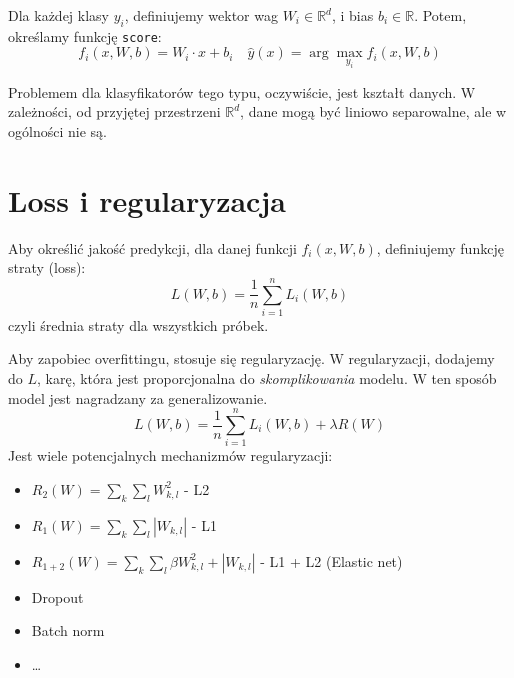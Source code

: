 \documentclass{../notatki}
\begin{document}
Dla każdej klasy $y_i$, definiujemy wektor wag $W_i \in
\mathbb{R}^d$, i bias $b_i \in \mathbb{R}$. Potem, określamy funkcję
\texttt{score}:
$$
f_i(x, W, b) = W_i \cdot x + b_i \quad \hat{y}(x) = \arg\max_{y_i} f_i(x, W, b)
$$

Problemem dla klasyfikatorów tego typu, oczywiście, jest kształt
danych. W zależności, od przyjętej przestrzeni $\mathbb{R}^d$, dane
mogą być liniowo separowalne, ale w ogólności nie są.

\section{Loss i regularyzacja}

Aby określić jakość predykcji, dla danej funkcji $f_i(x, W, b)$,
definiujemy funkcję straty (loss):
$$
L(W, b) = \frac{1}{n} \sum_{i=1}^n L_i(W, b)
$$
czyli średnia straty dla wszystkich próbek.

Aby zapobiec overfittingu, stosuje się regularyzację. W regularyzacji, dodajemy
do $L$, karę, która jest proporcjonalna do \textit{skomplikowania} modelu. W
ten sposób model jest nagradzany za generalizowanie.
$$
L(W, b) = \frac{1}{n} \sum_{i=1}^n L_i(W, b) + \lambda R(W)
$$
Jest wiele potencjalnych mechanizmów regularyzacji:
\begin{itemize}
  \item $R_2(W) = \sum_k \sum_l W_{k,l}^2$ - L2
  \item $R_1(W) = \sum_k \sum_l |W_{k,l}|$ - L1
  \item $R_{1 + 2}(W) = \sum_k \sum_l \beta W_{k,l}^2 + |W_{k,l}|$ -
    L1 + L2 (Elastic net)
  \item Dropout
  \item Batch norm
  \item \dots
\end{itemize}
\end{document}
